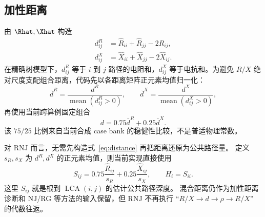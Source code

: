 \subsection{加性距离}

由 $\Rhat,\Xhat$ 构造
\begin{align}
  d^R_{ij}&=\widehat R_{ii}+\widehat R_{jj}-2\widehat R_{ij},\\
  d^X_{ij}&=\widehat X_{ii}+\widehat X_{jj}-2\widehat X_{ij}.
  \label{eq:distance}
\end{align}
在精确树模型下，$d^R_{ij}$ 等于 $i$ 到 $j$ 路径的电阻和，$d^X_{ij}$
等于电抗和。为避免 $R/X$ 绝对尺度支配组合距离，代码先以各距离矩阵正元素均值归一化：
\[
\bar d^R=\frac{d^R}{\operatorname{mean}(d^R_{ij}>0)},\qquad
\bar d^X=\frac{d^X}{\operatorname{mean}(d^X_{ij}>0)},
\]
再使用当前跨算例固定组合
\begin{equation}
  d=0.75\bar d^R+0.25\bar d^X.
  \label{eq:mixed-distance}
\end{equation}
该 $75/25$ 比例来自当前合成 case bank 的稳健性比较，不是普适物理常数。

对 RNJ 而言，无需先构造式~\eqref{eq:distance} 再把距离还原为公共路径量。
定义 $s_R,s_X$ 为 $d^R,d^X$ 的正元素均值，则当前实现直接使用
\begin{equation}
  S_{ij}=0.75\frac{\widehat R_{ij}}{s_R}
  +0.25\frac{\widehat X_{ij}}{s_X},
  \qquad H_i=S_{ii}.
  \label{eq:direct-shared-score}
\end{equation}
这里 $S_{ij}$ 就是根到 $\operatorname{LCA}(i,j)$ 的估计公共路径深度。
混合距离仍作为加性距离诊断和 NJ/RG 等方法的输入保留，但 RNJ 不再执行
``$R/X\to d\to\rho\to R/X$'' 的代数往返。
